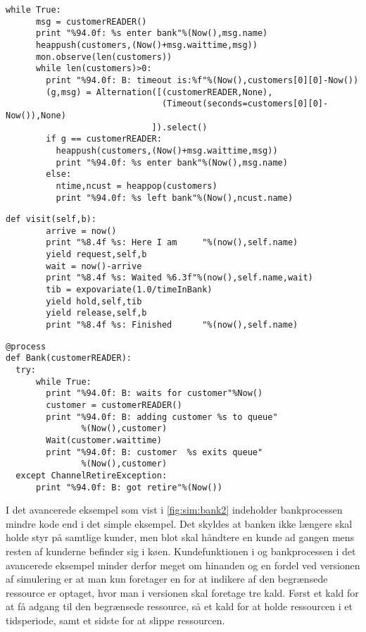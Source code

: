 \begin{lstlisting}[firstnumber=39,float=hbtp, label=fig:sim:bank, caption= Uddrag af bank processen i simulation]
    while True:
      msg = customerREADER()
      print "%94.0f: %s enter bank"%(Now(),msg.name)
      heappush(customers,(Now()+msg.waittime,msg))
      mon.observe(len(customers))
      while len(customers)>0:
        print "%94.0f: B: timeout is:%f"%(Now(),customers[0][0]-Now())
        (g,msg) = Alternation([(customerREADER,None),
                               (Timeout(seconds=customers[0][0]- Now()),None)
                             ]).select()
        if g == customerREADER:
          heappush(customers,(Now()+msg.waittime,msg))
          print "%94.0f: %s enter bank"%(Now(),msg.name)
        else:
          ntime,ncust = heappop(customers)
          print "%94.0f: %s left bank"%(Now(),ncust.name) 
\end{lstlisting}
\begin{lstlisting}[firstnumber=20 ,float=hbtp, label=fig:simpy:customer, caption=funktionen \code{visit} i \simpy]
     def visit(self,b):                                
        arrive = now()
        print "%8.4f %s: Here I am     "%(now(),self.name)
        yield request,self,b                          
        wait = now()-arrive
        print "%8.4f %s: Waited %6.3f"%(now(),self.name,wait)
        tib = expovariate(1.0/timeInBank)            
        yield hold,self,tib                          
        yield release,self,b                         
        print "%8.4f %s: Finished      "%(now(),self.name)
\end{lstlisting}
\begin{lstlisting}[firstnumber=33 ,float=hbtp, label=fig:sim:bank2, caption=Bankprocessen hvor banken er en begrænset ressource. ]
  @process
def Bank(customerREADER):
  try:
      while True:
        print "%94.0f: B: waits for customer"%Now()
        customer = customerREADER()
        print "%94.0f: B: adding customer %s to queue"
               %(Now(),customer)
        Wait(customer.waittime)
        print "%94.0f: B: customer  %s exits queue"
               %(Now(),customer)
  except ChannelRetireException:
      print "%94.0f: B: got retire"%(Now())

\end{lstlisting}
I det avancerede eksempel som vist i  \cref{fig:sim:bank2} indeholder bankprocessen mindre kode end i det simple eksempel. Det skyldes at banken ikke længere skal holde styr på samtlige kunder, men blot skal håndtere en kunde ad gangen mens resten af kunderne befinder sig i køen. Kundefunktionen i \simpy og bankprocessen i det avancerede eksempel minder derfor meget om hinanden og en fordel ved \pycsp versionen af simulering er at man kun foretager en  for at indikere af den begrænsede ressource er optaget, hvor man i \simpy versionen skal foretage tre kald. Først et kald for at få adgang til den begrænsede ressource, så et kald for at holde ressourcen i et tidsperiode, samt et sidste for at slippe ressourcen.

  
